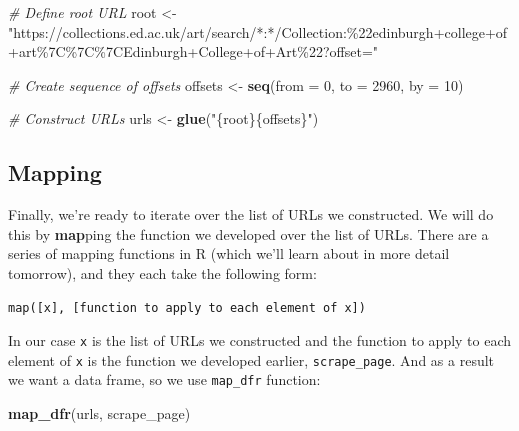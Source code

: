 \documentclass[
]{article}
\newenvironment{Shaded}{\begin{snugshade}}{\end{snugshade}}
\newcommand{\AttributeTok}[1]{\textcolor[rgb]{0.13,0.29,0.53}{#1}}
\newcommand{\CommentTok}[1]{\textcolor[rgb]{0.56,0.35,0.01}{\textit{#1}}}
\newcommand{\DecValTok}[1]{\textcolor[rgb]{0.00,0.00,0.81}{#1}}
\newcommand{\FunctionTok}[1]{\textcolor[rgb]{0.13,0.29,0.53}{\textbf{#1}}}
\newcommand{\NormalTok}[1]{#1}
\newcommand{\OtherTok}[1]{\textcolor[rgb]{0.56,0.35,0.01}{#1}}
\newcommand{\StringTok}[1]{\textcolor[rgb]{0.31,0.60,0.02}{#1}}
\begin{document}
\begin{Shaded}
\begin{Highlighting}[]
\CommentTok{\# Define root URL}
\NormalTok{root }\OtherTok{\textless{}{-}} \StringTok{"https://collections.ed.ac.uk/art/search/*:*/Collection:\%22edinburgh+college+of+art\%7C\%7C\%7CEdinburgh+College+of+Art\%22?offset="}

\CommentTok{\# Create sequence of offsets}
\NormalTok{offsets }\OtherTok{\textless{}{-}} \FunctionTok{seq}\NormalTok{(}\AttributeTok{from =} \DecValTok{0}\NormalTok{, }\AttributeTok{to =} \DecValTok{2960}\NormalTok{, }\AttributeTok{by =} \DecValTok{10}\NormalTok{)}

\CommentTok{\# Construct URLs}
\NormalTok{urls }\OtherTok{\textless{}{-}} \FunctionTok{glue}\NormalTok{(}\StringTok{"\{root\}\{offsets\}"}\NormalTok{)}
\end{Highlighting}
\end{Shaded}

\subsection{Mapping}\label{mapping}

Finally, we're ready to iterate over the list of URLs we constructed. We
will do this by \textbf{map}ping the function we developed over the list
of URLs. There are a series of mapping functions in R (which we'll learn
about in more detail tomorrow), and they each take the following form:

\begin{verbatim}
map([x], [function to apply to each element of x])
\end{verbatim}

In our case \texttt{x} is the list of URLs we constructed and the
function to apply to each element of \texttt{x} is the function we
developed earlier, \texttt{scrape\_page}. And as a result we want a data
frame, so we use \texttt{map\_dfr} function:

\begin{Shaded}
\begin{Highlighting}[]
\FunctionTok{map\_dfr}\NormalTok{(urls, scrape\_page)}
\end{Highlighting}
\end{Shaded}
\end{document}
